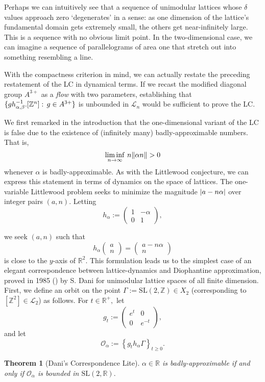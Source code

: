 \documentclass[12pt, letterpaper, oneside]{book}
\newcommand{\ga}{\ensuremath{\alpha}}
\newcommand{\gb}{\ensuremath{\beta}}
\newcommand{\gd}{\ensuremath{\delta}}
\newcommand{\R}{\mathbb{R}}
\newcommand{\Z}{\mathbb{Z}}
\DeclarePairedDelimiter{\abs}{\lvert}{\rvert}
\DeclarePairedDelimiter{\norm}{\lVert}{\rVert}
\DeclarePairedDelimiter{\set}{\lbrace}{\rbrace}
\theoremstyle{plain}
\newtheorem{theorem}{Theorem}
\theoremstyle{definition}
\theoremstyle{remark}
\begin{document}
Perhaps we can intuitively see that a sequence of unimodular lattices whose $\gd$ values approach zero `degenerates' in a sense: as one dimension of the lattice's fundamental domain gets extremely small, the others get near-infinitely large. This is a sequence with no obvious limit point. In the two-dimensional case, we can imagine a sequence of parallelograms of area one that stretch out into something resembling a line. 

With the compactness criterion in mind, we can actually restate the preceding restatement of the LC in dynamical terms. If we recast the modified diagonal group $A^{3+}$ as a \textit{flow} with two parameters, establishing that $\set{gh_{\ga, \gb}^{-1}.[\Z^n]:\,g \in A^{3+}}$ is unbounded in $\mathcal{L}_n$ would be sufficient to prove the LC. 

We first remarked in the introduction that the one-dimensional variant of the LC is false due to the existence of (infinitely many) badly-approximable numbers. That is,
\[
 \liminf\limits_{n \to \infty}\,n \norm{\alpha n} > 0
\]
whenever $\ga$ is badly-approximable. As with the Littlewood conjecture, we can express this statement in terms of dynamics on the space of lattices. The one-variable Littlewood problem seeks to minimize the magnitude $\abs{a - n\ga}$ over integer pairs $(a,n).$ Letting
\[
h_\ga := \begin{pmatrix}
1 & -\ga \\
0 & 1
\end{pmatrix},
\]

 we seek $(a,n)$ such that
\[
h_\ga \begin{pmatrix}
a \\
n 
\end{pmatrix}
= \begin{pmatrix}
a - n\ga \\
n
\end{pmatrix}
\]
is close to the $y$-axis of $\R^2.$ This formulation leads us to the simplest case of an elegant correspondence between lattice-dynamics and Diophantine approximation, proved in 1985 (\cite{Kle98}) by S. Dani for unimodular lattice spaces of all finite dimension. First, we define an orbit on the point $\Gamma := \mbox{SL}(2, \Z) \in X_2$ (corresponding to $[\Z^2] \in \mathcal{L}_2$) as follows. For $t \in \R^+,$ let
\[
g_t := \begin{pmatrix} e^t & 0 \\ 0 & e^{-t} \end{pmatrix},
\]
and let
\[
\mathcal{O}_{\ga} := \left \{g_t h_\ga \Gamma \right \}_{t \geq 0}.
\]
\begin{theorem}[Dani's Correspondence Lite]
$\ga \in \R$ is badly-approximable if and only if $\mathcal{O}_{\ga}$ is bounded in $\mbox{SL}(2,\R).$ 
\end{theorem}
\end{document}
